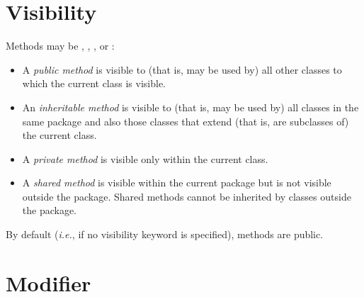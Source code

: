 \section{Visibility}
 
Methods may be , ,
, or :
\begin{itemize}
\item A \emph{public method} is visible to (that is, may be used by)
all other classes to which the current class is visible.
\item An \emph{inheritable method} is visible to (that is, may be used
by) all classes in the same package and also those classes that extend
(that is, are subclasses of) the current class.
\item A \emph{private method} is visible only within the current
class.
\item 
A \emph{shared method} is visible within the current package
but is not visible outside the package.  Shared methods cannot be
inherited by classes outside the package.
\end{itemize}
 
By default (\emph{i.e.}, if no visibility keyword is specified),  methods
are public.
\section{Modifier}
 
